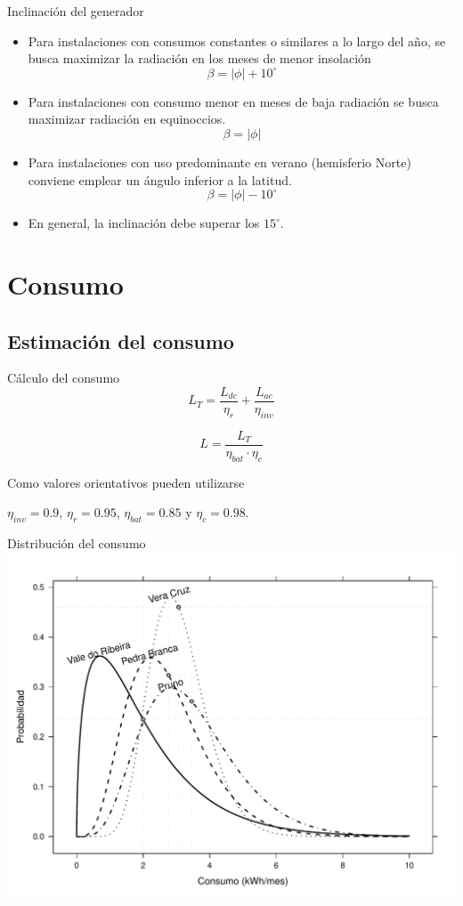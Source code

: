 \documentclass[xcolor={usenames,svgnames,dvipsnames}]{beamer}
\begin{document}
\begin{frame}[label=sec-1-5-4]{Inclinación del generador}
\begin{itemize}
\item Para instalaciones con \alert{consumos constantes o similares a lo largo del año}, se busca maximizar la radiación en los meses de menor insolación $$\beta=|\phi|+10^{\circ}$$

\item Para instalaciones con \alert{consumo menor en meses de baja radiación} se busca maximizar radiación en equinoccios.$$\beta=|\phi|$$

\item Para instalaciones con \alert{uso predominante en verano} (hemisferio Norte) conviene emplear un ángulo inferior a la latitud. $$\beta=|\phi|-10^{\circ}$$

\item En general, la inclinación \alert{debe superar} los $15^{\circ}$.
\end{itemize}
\end{frame}

\section{Consumo}
\label{sec-2}

\subsection{Estimación del consumo}
\label{sec-2-1}
\begin{frame}[label=sec-2-1-1]{Cálculo del consumo}
$$L_{T}=\frac{L_{dc}}{\eta_{r}}+\frac{L_{ac}}{\eta_{inv}}$$

$$L=\frac{L_{T}}{\eta_{bat}\cdot\eta_{c}}$$

Como valores orientativos pueden utilizarse

$\eta_{inv}=0.9$, $\eta_{r}=0.95$, $\eta_{bat}=0.85$ y $\eta_{c}=0.98$.
\end{frame}

\begin{frame}[label=sec-2-1-2]{Distribución del consumo}
\includegraphics[width=.9\linewidth]{../figs/ConsumoGamma.pdf}
\end{frame}
\end{document}
